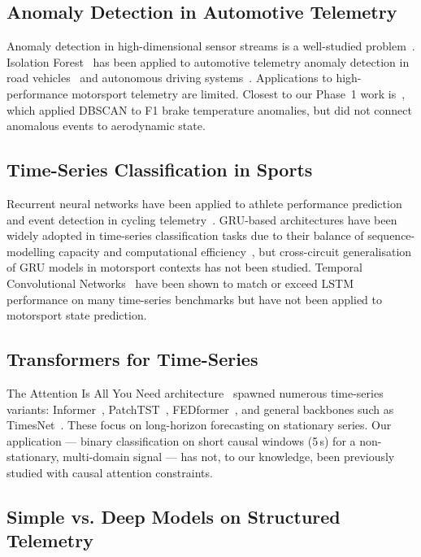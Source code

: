 \documentclass[conference,a4paper]{IEEEtran}
\begin{document}
\subsection{Anomaly Detection in Automotive Telemetry}

Anomaly detection in high-dimensional sensor streams is a well-studied problem~\cite{ref_chandola,ref_ruff}.
Isolation Forest~\cite{ref_iforest} has been applied to automotive telemetry anomaly
detection in road vehicles~\cite{ref_veh_anomaly} and autonomous driving systems~\cite{ref_ad_anomaly}.
Applications to high-performance motorsport telemetry are limited.
Closest to our Phase~1 work is~\cite{ref_f1_anomaly}, which applied DBSCAN to F1
brake temperature anomalies, but did not connect anomalous events to aerodynamic state.

\subsection{Time-Series Classification in Sports}

Recurrent neural networks have been applied to athlete performance prediction~\cite{ref_athlete}
and event detection in cycling telemetry~\cite{ref_cycling}.
GRU-based architectures have been widely adopted in time-series classification tasks due
to their balance of sequence-modelling capacity and computational efficiency~\cite{ref_tcn},
but cross-circuit generalisation of GRU models in motorsport contexts has not been studied.
Temporal Convolutional Networks~\cite{ref_tcn} have been shown to match or exceed
LSTM performance on many time-series benchmarks but have not been applied to motorsport
state prediction.

\subsection{Transformers for Time-Series}

The Attention Is All You Need architecture~\cite{ref_attention} spawned numerous
time-series variants: Informer~\cite{ref_informer}, PatchTST~\cite{ref_patchtst},
FEDformer~\cite{ref_fedformer}, and general backbones such as TimesNet~\cite{ref_timesnet}.
These focus on long-horizon forecasting on stationary series.
Our application — binary classification on short causal windows (5\,s) for a
non-stationary, multi-domain signal — has not, to our knowledge, been previously
studied with causal attention constraints.

\subsection{Simple vs. Deep Models on Structured Telemetry}
\end{document}
